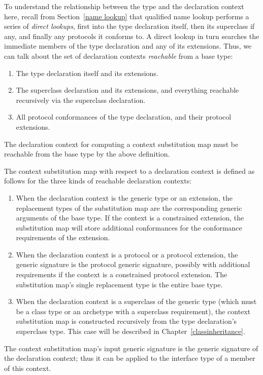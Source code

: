 \documentclass[../generics]{subfiles}
\begin{document}
To understand the relationship between the type and the declaration context here, recall from Section~\ref{name lookup} that qualified name lookup performs a series of \emph{direct lookups}, first into the type declaration itself, then its superclass if any, and finally any protocols it conforms to. A direct lookup in turn searches the immediate members of the type declaration and any of its extensions. Thus, we can talk about the set of declaration contexts \emph{reachable} from a base type:
\begin{enumerate}
\item The type declaration itself and its extensions.
\item The superclass declaration and its extensions, and everything reachable recursively via the superclass declaration.
\item All protocol conformances of the type declaration, and their protocol extensions.
\end{enumerate}
The declaration context for computing a context substitution map must be reachable from the base type by the above definition.

\begin{definition}\label{context substitution map for decl context} The context substitution map with respect to a declaration context is defined as follows for the three kinds of reachable declaration contexts:
\begin{enumerate}
\item When the declaration context is the generic type or an extension, the replacement types of the substitution map are the corresponding generic arguments of the base type. If the context is a constrained extension, the substitution map will store additional conformances for the conformance requirements of the extension.
\item When the declaration context is a protocol or a protocol extension, the generic signature is the protocol generic signature, possibly with additional requirements if the context is a constrained protocol extension. The substitution map's single replacement type is the entire base type.
\item When the declaration context is a superclass of the generic type (which must be a class type or an archetype with a superclass requirement), the context substitution map is constructed recursively from the type declaration's superclass type. This case will be described in Chapter~\ref{classinheritance}.
\end{enumerate}
The context substitution map's input generic signature is the generic signature of the declaration context; thus it can be applied to the interface type of a member of this context.
\end{definition}
\end{document}
